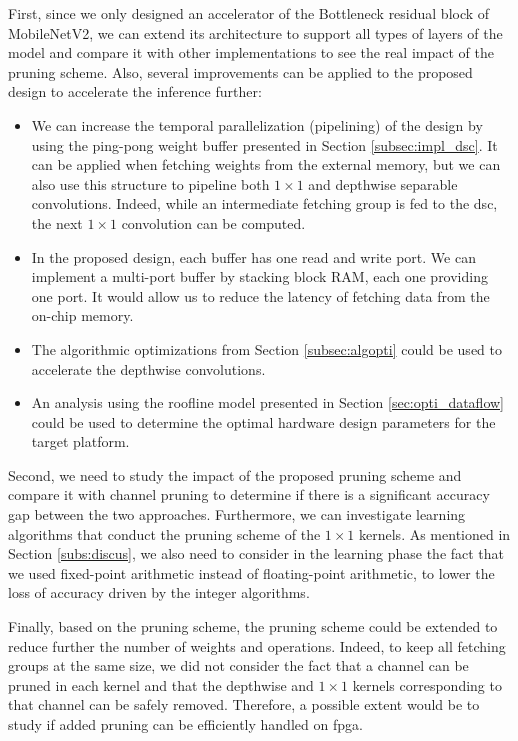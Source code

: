 First, since we only designed an accelerator of the Bottleneck residual block of MobileNetV2, we can extend its architecture to support all types of layers of the model and compare it with other implementations to see the real impact of the pruning scheme. Also, several improvements can be applied to the proposed design to accelerate the inference further:
%
\begin{itemize}
    \item We can increase the temporal parallelization (pipelining) of the design by using the ping-pong weight buffer presented in Section \ref{subsec:impl_dsc}. It can be applied when fetching weights from the external memory, but we can also use this structure to pipeline both $1 \times 1$ and depthwise separable convolutions. Indeed, while an intermediate fetching group is fed to the \acrshort{dsc}, the next $1 \times 1$ convolution can be computed. 
    \item In the proposed design, each buffer has one read and write port. We can implement a multi-port buffer by stacking block RAM, each one providing one port. It would allow us to reduce the latency of fetching data from the on-chip memory.
    \item The algorithmic optimizations from Section \ref{subsec:algopti} could be used to accelerate the depthwise convolutions.
    \item An analysis using the roofline model presented in Section \ref{sec:opti_dataflow} could be used to determine the optimal hardware design parameters for the target platform.
\end{itemize}
%
Second, we need to study the impact of the proposed pruning scheme and compare it with channel pruning to determine if there is a significant accuracy gap between the two approaches. Furthermore, we can investigate learning algorithms that conduct the pruning scheme of the $1 \times 1$ kernels. As mentioned in Section \ref{subs:discus}, we also need to consider in the learning phase the fact that we used fixed-point arithmetic instead of floating-point arithmetic, to lower the loss of accuracy driven by the integer algorithms.

Finally, based on the pruning scheme, the pruning scheme could be extended to reduce further the number of weights and operations. Indeed, to keep all fetching groups at the same size, we did not consider the fact that a channel can be pruned in each kernel and that the depthwise and $1 \times 1$ kernels corresponding to that channel can be safely removed. Therefore, a possible extent would be to study if added pruning can be efficiently handled on \acrshort{fpga}.
\newpage
